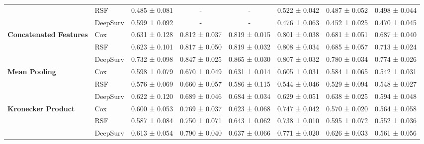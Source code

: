 \begin{sidewaystable}[htbp]
\begin{tabular}{@{}llcccccc@{}}
        & RSF & 0.485 ± 0.081 & - & - & 0.522 ± 0.042 & 0.487 ± 0.052 & 0.498 ± 0.044 \\
        & DeepSurv & 0.599 ± 0.092 & - & - & 0.476 ± 0.063 & 0.452 ± 0.025 & 0.470 ± 0.045 \\
        \midrule
        \multirow{3}{*}{\textbf{Concatenated Features}} & Cox & 0.631 ± 0.128 & 0.812 ± 0.037 & 0.819 ± 0.015 & 0.801 ± 0.038 & 0.681 ± 0.051 & 0.687 ± 0.040 \\
        & RSF & 0.623 ± 0.101 & 0.817 ± 0.050 & 0.819 ± 0.032 & 0.808 ± 0.034 & 0.685 ± 0.057 & 0.713 ± 0.024 \\
        & DeepSurv & 0.732 ± 0.098 & 0.847 ± 0.025 & 0.865 ± 0.030 & 0.807 ± 0.032 & 0.780 ± 0.034 & 0.774 ± 0.026 \\
        \midrule
        \multirow{3}{*}{\textbf{Mean Pooling}} & Cox & 0.598 ± 0.079 & 0.670 ± 0.049 & 0.631 ± 0.014 & 0.605 ± 0.031 & 0.584 ± 0.065 & 0.542 ± 0.031 \\
        & RSF & 0.576 ± 0.069 & 0.660 ± 0.057 & 0.586 ± 0.115 & 0.544 ± 0.046 & 0.529 ± 0.094 & 0.548 ± 0.027 \\
        & DeepSurv & 0.622 ± 0.120 & 0.689 ± 0.046 & 0.684 ± 0.034 & 0.629 ± 0.051 & 0.638 ± 0.025 & 0.594 ± 0.048 \\
        \midrule
        \multirow{3}{*}{\textbf{Kronecker Product}} & Cox & 0.600 ± 0.053 & 0.769 ± 0.037 & 0.623 ± 0.068 & 0.747 ± 0.042 & 0.570 ± 0.020 & 0.564 ± 0.058 \\
        & RSF & 0.587 ± 0.084 & 0.750 ± 0.071 & 0.643 ± 0.062 & 0.738 ± 0.010 & 0.595 ± 0.072 & 0.552 ± 0.036 \\
        & DeepSurv & 0.613 ± 0.054 & 0.790 ± 0.040 & 0.637 ± 0.066 & 0.771 ± 0.020 & 0.626 ± 0.033 & 0.561 ± 0.056 \\
        \bottomrule
    \end{tabular}
\end{sidewaystable}


